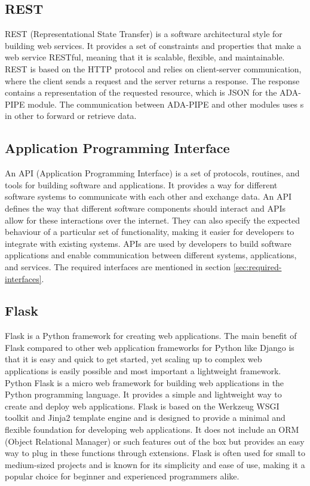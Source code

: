 \documentclass{article}
\begin{document}
        \subsection{REST}

            REST (Representational State Transfer) is a software architectural style for building web services. It provides a set of constraints and properties that make a web service RESTful, meaning that it is scalable, flexible, and maintainable. REST is based on the HTTP protocol and relies on client-server communication, where the client sends a request and the server returns a response. 
            The response contains a representation of the requested resource, which is JSON for the ADA-PIPE module.
            The communication between ADA-PIPE and other modules uses s in other to forward or retrieve data.
            


        \subsection{Application Programming Interface}
        \label{sec:api}
            An API (Application Programming Interface) is a set of protocols, routines, and tools for building software and applications. It provides a way for different software systems to communicate with each other and exchange data. An API defines the way that different software components should interact and APIs allow for these interactions over the internet. They can also specify the expected behaviour of a particular set of functionality, making it easier for developers to integrate with existing systems. APIs are used by developers to build software applications and enable communication between different systems, applications, and services.
            The required interfaces are mentioned in section \ref{sec:required-interfaces}.

        \subsection{Flask}
        \label{sec:flask}

            Flask is a Python framework for creating web applications.
            The main benefit of Flask compared to other web application frameworks for Python like Django is that it is easy and quick to get started, yet scaling up to complex web applications is easily possible and most important a lightweight framework.
            Python Flask is a micro web framework for building web applications in the Python programming language. It provides a simple and lightweight way to create and deploy web applications. Flask is based on the Werkzeug WSGI toolkit and Jinja2 template engine and is designed to provide a minimal and flexible foundation for developing web applications. It does not include an ORM (Object Relational Manager) or such features out of the box but provides an easy way to plug in these functions through extensions. Flask is often used for small to medium-sized projects and is known for its simplicity and ease of use, making it a popular choice for beginner and experienced programmers alike.
\end{document}
